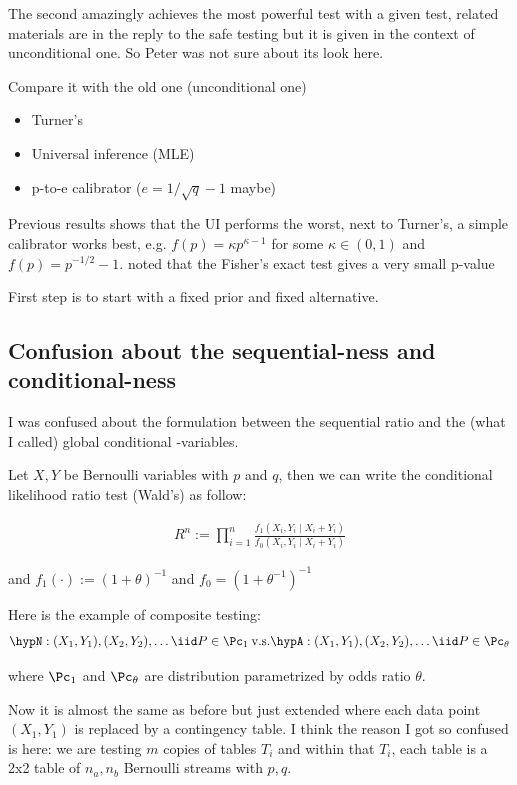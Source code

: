 The second amazingly achieves the most powerful test with a given test,
related materials are in the reply to the safe testing but it is given in
the context of unconditional one. So Peter was not sure about its look here.

Compare it with the old one (unconditional one)
\begin{itemize}
	\item Turner's
	\item Universal inference (MLE)
	\item p-to-e calibrator ($e = 1/\sqrt{q} - 1$ maybe)
\end{itemize}

Previous results shows that the UI performs the worst, next to Turner's,
a simple calibrator works best, e.g. $f(p) = \kappa p^{\kappa-1}$ for some $\kappa \in(0,1)$
and $f(p) = p^{-1/2}-1$.
noted that the Fisher's exact test gives a very small p-value

First step is to start with a fixed prior and fixed alternative.

\subsection*{Confusion about the sequential-ness and conditional-ness}

I was confused about the formulation between the sequential ratio and
the (what I called) global conditional \E-variables.

Let $X,Y$ be Bernoulli variables with $p$ and $q$, then we can write the
conditional likelihood ratio test (Wald's) as follow:

\begin{align*}
	R^n := \prod_{i=1}^n \frac{f_1(X_i, Y_i \mid X_i + Y_i)}{f_0(X_i, Y_i \mid X_i + Y_i)}
\end{align*}

and $f_1(\cdot) := (1 + \theta)^{-1}$ and $f_0 = (1 + \theta^{-1})^{-1}$

Here is the example of composite testing:
\begin{align*}
	\hypN: (X_1, Y_1), (X_2,Y_2),\dots \iid P \in \Pc_1 \: \textrm{v.s.}
	\hypA: (X_1, Y_1), (X_2,Y_2),\dots \iid P \in \Pc_{\theta}
\end{align*}

where $\Pc_1$ and $\Pc_{\theta}$ are distribution parametrized by odds ratio $\theta$.

Now it is almost the same as before but just extended where each data point $(X_1, Y_1)$
is replaced by a contingency table.
I think the reason I got so confused is here:
we are testing $m$ copies of tables $T_i$ and within that $T_i$,
each table is a 2x2 table of $n_a, n_b$ Bernoulli streams with $p, q$.


